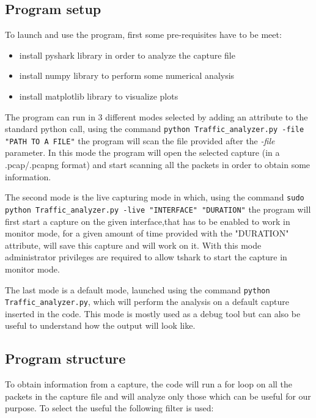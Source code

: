 \subsection{Program setup}
To launch and use the program, first some pre-requisites have to be meet:
\begin{itemize}
    \item install pyshark library in order to analyze the capture file 
    \item install numpy library to perform some numerical analysis
    \item install matplotlib library to visualize plots
\end{itemize}
The program can run in 3 different modes selected by adding an attribute to the standard 
python call, using the command \texttt{python Traffic\_analyzer.py -file "PATH TO A FILE"} 
the program will scan the file provided after the \textit{-file} parameter. In this mode the program
will open the selected capture (in a .pcap/.pcapng format) and start scanning all the packets in 
order to obtain some information. 

The second mode is the live capturing mode in which, using the command \texttt{sudo python
Traffic\_analyzer.py -live "INTERFACE" "DURATION"} the program will first start a 
capture on the given interface,that has to be enabled to work in monitor mode, for a given 
amount of time provided with the "DURATION" attribute, will save this capture and will work
on it. With this mode administrator privileges are required to allow tshark to start the 
capture in monitor mode.  

The last mode is a default mode, launched using the command \texttt{python Traffic\_analyzer.py},
which will perform the analysis on a default capture inserted in the code. This mode is mostly 
used as a debug tool but can also be useful to understand how the output will look like.

\subsection{Program structure}
To obtain information from a capture, the code will run a for loop on all the packets in the 
capture file and will analyze only those which can be useful for our purpose. To select the 
useful the following filter is used:


